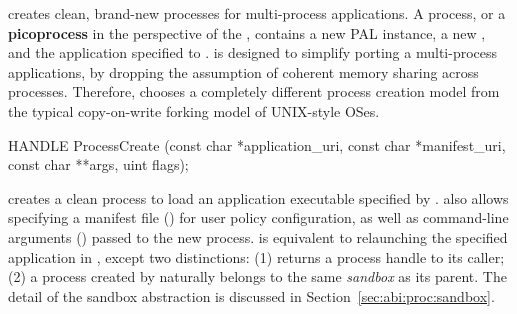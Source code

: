 \Thehostabi{} creates clean, brand-new processes
for multi-process applications.
A process, or a {\bf picoprocess} in the perspective of the \libos{}, contains a new PAL instance,
a new \libos{},
and the application specified to \thehostabi{}.
\Thehostabi{} is designed to simplify porting a multi-process applications,
by dropping the assumption of
coherent memory sharing across processes.
Therefore, \thehostabi{} chooses a completely different process creation model
from the typical copy-on-write forking model
of UNIX-style OSes.









\begin{paldef}
HANDLE ProcessCreate (const char *application_uri,
                      const char *manifest_uri,
                      const char **args, uint flags);
\end{paldef}


 creates a clean process to load an application executable specified by
. %
 also allows specifying a manifest file () for user policy configuration, as well as command-line arguments () passed to the new process.
 is equivalent to
relaunching the specified application in \graphene{},
except two distinctions: (1)  returns a process handle to its caller;
(2) a process created by  naturally belongs to the same {\em sandbox} as its parent.
The detail of the sandbox abstraction is discussed in Section~\ref{sec:abi:proc:sandbox}.




